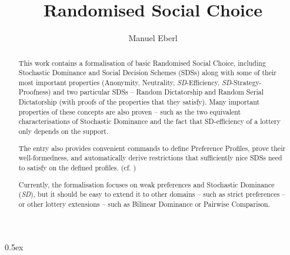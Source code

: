 \documentclass[11pt,a4paper]{article}
\begin{document}
\title{Randomised Social Choice}
\author{Manuel Eberl}
\maketitle

\begin{abstract}
This work contains a formalisation of basic Randomised Social Choice, including Stochastic Dominance
and Social Decision Schemes (SDSs) along with some of their most important properties 
(Anonymity, Neutrality, \textit{SD}-Efficiency, \textit{SD}-Strategy-Proofness) and two particular SDSs -- Random Dictatorship 
and Random Serial Dictatorship (with proofs of the properties that they satisfy). Many important properties of these 
concepts are also proven -- such as the two equivalent characterisations of Stochastic Dominance and the fact that 
SD-efficiency of a lottery only depends on the support.

The entry also provides convenient commands to define Preference Profiles, prove their well-formedness, and 
automatically derive restrictions that sufficiently nice SDSs need to satisfy on the defined profiles. (cf. \cite{smt})

Currently, the formalisation focuses on weak preferences and Stochastic Dominance (\textit{SD}), but it should be easy to extend it 
to other domains -- such as strict preferences -- or other lottery extensions -- such as Bilinear Dominance or Pairwise Comparison.
\end{abstract}

\tableofcontents

\parindent 0pt\parskip 0.5ex
\newpage





\end{document}

